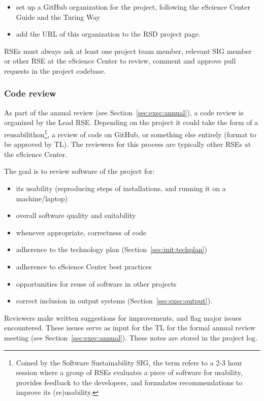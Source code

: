 \begin{itemize}\itemsep0em
\item set up a GitHub organization for the project, following the eScience Center Guide and the Turing Way~\cite{the_turing_way-2023}
\item add the URL of this organization to the RSD project page.
\end{itemize}

RSEs must always ask at least one project team member, relevant SIG member or other RSE at the eScience Center to
review, comment and approve pull requests in the project codebase.

\subsubsection{Code review}
As part of the annual review (see Section~\ref{sec:exec:annual}), a code review is organized by the Lead RSE. Depending
on the project it could take the form of a reusabilithon\footnote{Coined by the Software Sustainability SIG, the term refers to a 2-3 hour session where a group of RSEs evaluates a piece of software for usability, provides feedback to the developers, and formulates recommendations to improve its (re)usability.}, a review of code on GitHub, or
something else entirely (format to be approved by TL). The reviewers for this process are typically other RSEs at the
eScience Center.


The goal is to review software of the project for:
\begin{itemize}\itemsep0em
\item its usability (reproducing steps of installations, and running it on a machine/laptop)
\item overall software quality and suitability
\item whenever appropriate, correctness of code
\item adherence to the technology plan (Section~\ref{sec:init:techplan})
\item adherence to eScience Center best practices
\item opportunities for reuse of software in other projects
\item correct inclusion in output systems (Section~\ref{sec:exec:output}).
\end{itemize}

Reviewers make written suggestions for improvements, and flag major issues encountered. These issues serve as input for
the TL for the formal annual review meeting (see Section~\ref{sec:exec:annual}). These notes are stored in the project log. 

